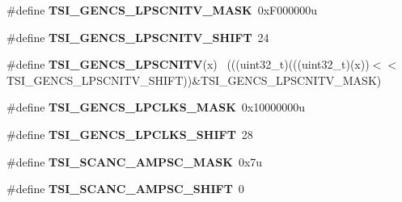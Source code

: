 \begin{DoxyCompactItemize}
\item 
\hypertarget{group___t_s_i___register___masks_gaf89fb1d534403dbb1be0df6093c0d529}{}\#define {\bfseries T\+S\+I\+\_\+\+G\+E\+N\+C\+S\+\_\+\+L\+P\+S\+C\+N\+I\+T\+V\+\_\+\+M\+A\+S\+K}~0x\+F000000u\label{group___t_s_i___register___masks_gaf89fb1d534403dbb1be0df6093c0d529}

\item 
\hypertarget{group___t_s_i___register___masks_ga925b30be99db125b6524ede3ef7af689}{}\#define {\bfseries T\+S\+I\+\_\+\+G\+E\+N\+C\+S\+\_\+\+L\+P\+S\+C\+N\+I\+T\+V\+\_\+\+S\+H\+I\+F\+T}~24\label{group___t_s_i___register___masks_ga925b30be99db125b6524ede3ef7af689}

\item 
\hypertarget{group___t_s_i___register___masks_gade959d31be4b537f59b115fbd4ca988a}{}\#define {\bfseries T\+S\+I\+\_\+\+G\+E\+N\+C\+S\+\_\+\+L\+P\+S\+C\+N\+I\+T\+V}(x)                                    ~(((uint32\+\_\+t)(((uint32\+\_\+t)(x))$<$$<$T\+S\+I\+\_\+\+G\+E\+N\+C\+S\+\_\+\+L\+P\+S\+C\+N\+I\+T\+V\+\_\+\+S\+H\+I\+F\+T))\&T\+S\+I\+\_\+\+G\+E\+N\+C\+S\+\_\+\+L\+P\+S\+C\+N\+I\+T\+V\+\_\+\+M\+A\+S\+K)\label{group___t_s_i___register___masks_gade959d31be4b537f59b115fbd4ca988a}

\item 
\hypertarget{group___t_s_i___register___masks_ga10761aaf1cd7148018bd3ae41583e66c}{}\#define {\bfseries T\+S\+I\+\_\+\+G\+E\+N\+C\+S\+\_\+\+L\+P\+C\+L\+K\+S\+\_\+\+M\+A\+S\+K}~0x10000000u\label{group___t_s_i___register___masks_ga10761aaf1cd7148018bd3ae41583e66c}

\item 
\hypertarget{group___t_s_i___register___masks_ga620a7a5a90382cea065b1498ff7a41ed}{}\#define {\bfseries T\+S\+I\+\_\+\+G\+E\+N\+C\+S\+\_\+\+L\+P\+C\+L\+K\+S\+\_\+\+S\+H\+I\+F\+T}~28\label{group___t_s_i___register___masks_ga620a7a5a90382cea065b1498ff7a41ed}

\item 
\hypertarget{group___t_s_i___register___masks_ga005284b8b7706c54a56d4c88f5974dc9}{}\#define {\bfseries T\+S\+I\+\_\+\+S\+C\+A\+N\+C\+\_\+\+A\+M\+P\+S\+C\+\_\+\+M\+A\+S\+K}~0x7u\label{group___t_s_i___register___masks_ga005284b8b7706c54a56d4c88f5974dc9}

\item 
\hypertarget{group___t_s_i___register___masks_ga2dae9d2c84538073c5ef08d391150c97}{}\#define {\bfseries T\+S\+I\+\_\+\+S\+C\+A\+N\+C\+\_\+\+A\+M\+P\+S\+C\+\_\+\+S\+H\+I\+F\+T}~0\label{group___t_s_i___register___masks_ga2dae9d2c84538073c5ef08d391150c97}


\end{DoxyCompactItemize}
